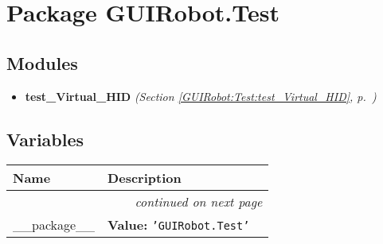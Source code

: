 %
%
%


\section{Package GUIRobot.Test}

    \label{GUIRobot:Test}


\subsection{Modules}

\begin{itemize}
\setlength{\parskip}{0ex}
\item \textbf{test\_Virtual\_HID}
  \textit{(Section \ref{GUIRobot:Test:test_Virtual_HID}, p.~\pageref{GUIRobot:Test:test_Virtual_HID})}

\end{itemize}



  \subsection{Variables}

    \vspace{-1cm}
\hspace{\varindent}\begin{longtable}{|p{\varnamewidth}|p{\vardescrwidth}|l}
\cline{1-2}
\cline{1-2} \centering \textbf{Name} & \centering \textbf{Description}& \\
\cline{1-2}
\endhead\cline{1-2}\multicolumn{3}{r}{\small\textit{continued on next page}}\\\endfoot\cline{1-2}
\endlastfoot\raggedright \_\-\_\-p\-a\-c\-k\-a\-g\-e\-\_\-\_\- & \raggedright \textbf{Value:} 
{\tt \texttt{'}\texttt{GUIRobot.Test}\texttt{'}}&\\
\cline{1-2}
\end{longtable}

